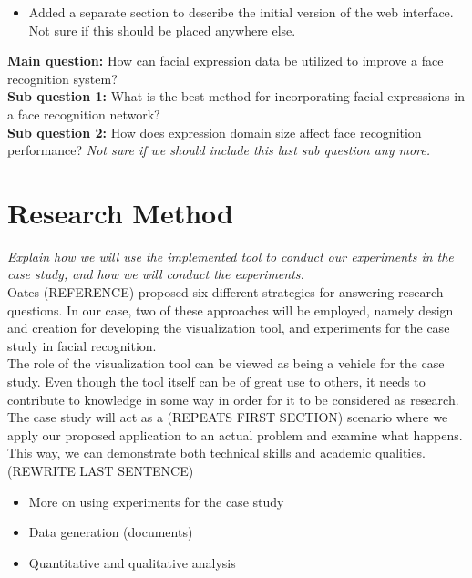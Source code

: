 \begin{itemize}
    \item Added a separate section to describe the initial version of the web interface. Not sure if this should be placed anywhere else.
\end{itemize}

\noindent\textbf{Main question:} How can facial expression data be utilized to improve a face recognition system? \\
\textbf{Sub question 1:} What is the best method for incorporating facial expressions in a face recognition network? \\
\textbf{Sub question 2:} How does expression domain size affect face recognition performance? \textit{Not sure if we should include this last sub question any more.}

\section{Research Method}

\textit{Explain how we will use the implemented tool to conduct our experiments in the case study, and how we will conduct the experiments.} \\

\noindent Oates (REFERENCE) proposed six different strategies for answering research questions. In our case, two of these approaches will be employed, namely design and creation for developing the visualization tool, and experiments for the case study in facial recognition. \\

\noindent The role of the visualization tool can be viewed as being a vehicle for the case study. Even though the tool itself can be of great use to others, it needs to contribute to knowledge in some way in order for it to be considered as research. The case study will act as a (REPEATS FIRST SECTION) scenario where we apply our proposed application to an actual problem and examine what happens. This way, we can demonstrate both technical skills and academic qualities. (REWRITE LAST SENTENCE)

\begin{itemize}
    \item More on using experiments for the case study
    \item Data generation (documents)
    \item Quantitative and qualitative analysis
\end{itemize}

